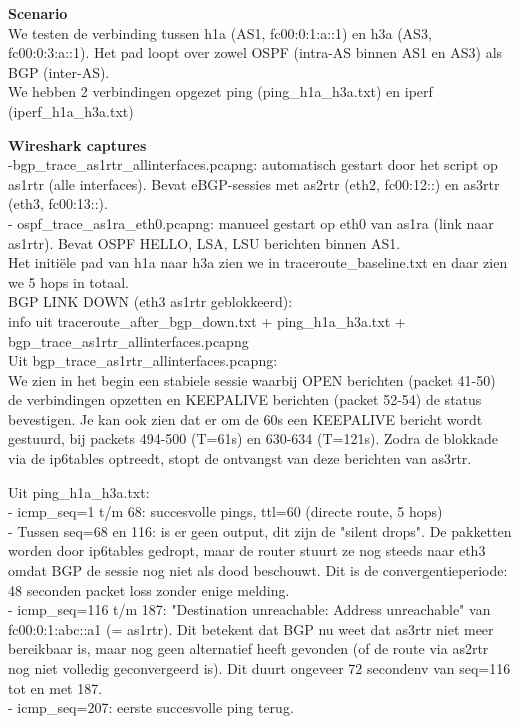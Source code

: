 \textbf{Scenario}\\
We testen de verbinding tussen h1a (AS1, fc00:0:1:a::1) en h3a (AS3, fc00:0:3:a::1).
Het pad loopt over zowel OSPF (intra-AS binnen AS1 en AS3) als BGP (inter-AS).\\

We hebben 2 verbindingen opgezet ping (ping\_h1a\_h3a.txt) en iperf (iperf\_h1a\_h3a.txt)

\textbf{Wireshark captures}\\
  -bgp\_trace\_as1rtr\_allinterfaces.pcapng: automatisch gestart door het script op as1rtr
     (alle interfaces). Bevat eBGP-sessies met as2rtr (eth2, fc00:12::) en as3rtr (eth3, fc00:13::).\\
  - ospf\_trace\_as1ra\_eth0.pcapng: manueel gestart op eth0 van as1ra (link naar as1rtr).
    Bevat OSPF HELLO, LSA, LSU berichten binnen AS1.\\

Het initiële pad van h1a naar h3a zien we in traceroute\_baseline.txt en daar zien we 5 hops in totaal.\\

BGP LINK DOWN (eth3 as1rtr geblokkeerd):\\
info uit traceroute\_after\_bgp\_down.txt + ping\_h1a\_h3a.txt + bgp\_trace\_as1rtr\_allinterfaces.pcapng\\

Uit bgp\_trace\_as1rtr\_allinterfaces.pcapng:\\
    We zien in het begin een stabiele sessie waarbij OPEN berichten (packet 41-50) de verbindingen opzetten en KEEPALIVE berichten (packet 52-54) de status bevestigen.
    Je kan ook zien dat er om de 60s een KEEPALIVE bericht wordt gestuurd, bij packets 494-500 (T=61s) en 630-634 (T=121s). Zodra de blokkade via de ip6tables optreedt, stopt de ontvangst van deze berichten van as3rtr.
    
Uit ping\_h1a\_h3a.txt:\\

  - icmp\_seq=1 t/m 68: succesvolle pings, ttl=60 (directe route, 5 hops)\\
  - Tussen seq=68 en 116: is er geen output, dit zijn de "silent drops".
    De pakketten worden door ip6tables gedropt, maar de router stuurt ze
    nog steeds naar eth3 omdat BGP de sessie nog niet als dood beschouwt.
    Dit is de convergentieperiode: 48 seconden packet loss zonder enige melding.\\
  - icmp\_seq=116 t/m 187: "Destination unreachable: Address unreachable" van fc00:0:1:abc::a1
    (= as1rtr). Dit betekent dat BGP nu weet dat as3rtr niet meer bereikbaar is, maar nog
    geen alternatief heeft gevonden (of de route via as2rtr nog niet volledig geconvergeerd is).
    Dit duurt ongeveer 72 secondenv van seq=116 tot en met 187.\\
  - icmp\_seq=207: eerste succesvolle ping terug.\

